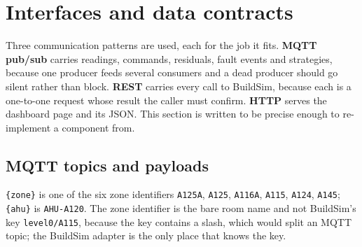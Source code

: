 \section{Interfaces and data contracts}\label{sec:5}

Three communication patterns are used, each for the job it fits. \textbf{MQTT pub/sub} carries
readings, commands, residuals, fault events and strategies, because one producer feeds several
consumers and a dead producer should go silent rather than block. \textbf{REST} carries every call
to BuildSim, because each is a one-to-one request whose result the caller must confirm.
\textbf{HTTP} serves the dashboard page and its JSON. This section is written to be precise enough
to re-implement a component from.

\subsection{MQTT topics and payloads}\label{sec:5.1}

\texttt{\{zone\}} is one of the six zone identifiers \texttt{A125A}, \texttt{A125},
\texttt{A116A}, \texttt{A115}, \texttt{A124}, \texttt{A145}; \texttt{\{ahu\}} is
\texttt{AHU-A120}. The zone identifier is the bare room name and not BuildSim's key
\texttt{level0/A115}, because the key contains a slash, which would split an MQTT topic; the
BuildSim adapter is the only place that knows the key.

